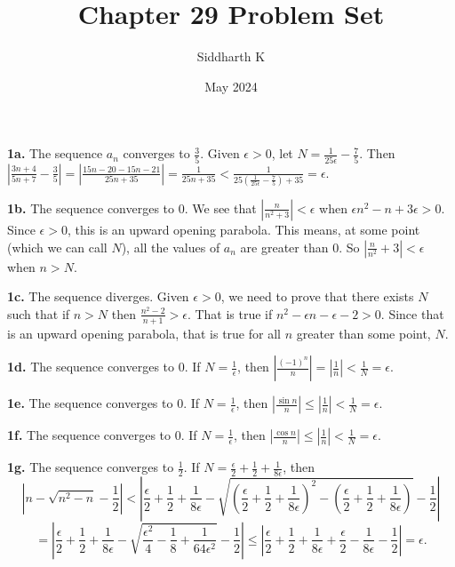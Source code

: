 \documentclass{article}
\title{Chapter 29 Problem Set}
\author{Siddharth K}
\date{May 2024}
\begin{document}
\maketitle

\textbf{1a.} The sequence $a_n$ converges to $\frac{3}{5}$. Given $\epsilon > 0$, let $N = \frac{1}{25\epsilon} - \frac{7}{5}$. Then $|\frac{3n + 4}{5n + 7} - \frac{3}{5}| = |\frac{15n - 20 - 15n - 21}{25n + 35}| = \frac{1}{25n + 35} < \frac{1}{25(\frac{1}{25\epsilon} - \frac{7}{5}) + 35} = \epsilon$.
\newline

\textbf{1b.} The sequence converges to $0$. We see that $|\frac{n}{n^2 + 3}| < \epsilon$ when $\epsilon n^2 - n + 3\epsilon > 0$. Since $\epsilon > 0$, this is an upward opening parabola. This means, at some point (which we can call $N$), all the values of $a_n$ are greater than $0$. So $|\frac{n}{n^2} + 3| < \epsilon$ when $n > N$.
\newline

\textbf{1c.} The sequence diverges. Given $\epsilon > 0$, we need to prove that there exists $N$ such that if $n > N$ then $\frac{n^2 - 2}{n + 1} > \epsilon$. That is true if $n^2 - \epsilon n - \epsilon - 2 > 0$. Since that is an upward opening parabola, that is true for all $n$ greater than some point, $N$.
\newline

\textbf{1d.} The sequence converges to $0$. If $N = \frac{1}{\epsilon}$, then $|\frac{(-1)^n}{n}| = |\frac{1}{n}| < \frac{1}{N} = \epsilon$.
\newline

\textbf{1e.} The sequence converges to $0$. If $N = \frac{1}{\epsilon}$, then $|\frac{\sin n}{n}| \le |\frac{1}{n}| < \frac{1}{N} = \epsilon$.
\newline

\textbf{1f.} The sequence converges to $0$. If $N = \frac{1}{\epsilon}$, then $|\frac{\cos n}{n}| \le |\frac{1}{n}| < \frac{1}{N} = \epsilon$.
\newline

\textbf{1g.} The sequence converges to $\frac{1}{2}$. If $N = \frac{\epsilon}{2} + \frac{1}{2} + \frac{1}{8\epsilon}$, then $$\left|n - \sqrt{n^2 - n} - \frac{1}{2}\right| < \left|\frac{\epsilon}{2} + \frac{1}{2} + \frac{1}{8\epsilon} - \sqrt{\left(\frac{\epsilon}{2} + \frac{1}{2} + \frac{1}{8\epsilon}\right)^2 - \left(\frac{\epsilon}{2} + \frac{1}{2} + \frac{1}{8\epsilon}\right)} - \frac{1}{2}\right|$$$$= \left|\frac{\epsilon}{2} + \frac{1}{2} + \frac{1}{8\epsilon} - \sqrt{\frac{\epsilon^2}{4} - \frac{1}{8} + \frac{1}{64\epsilon^2}} - \frac{1}{2}\right| \le \left|\frac{\epsilon}{2} + \frac{1}{2} + \frac{1}{8\epsilon} + \frac{\epsilon}{2} - \frac{1}{8\epsilon} - \frac{1}{2}\right| = \epsilon.$$
\newline
\end{document}
